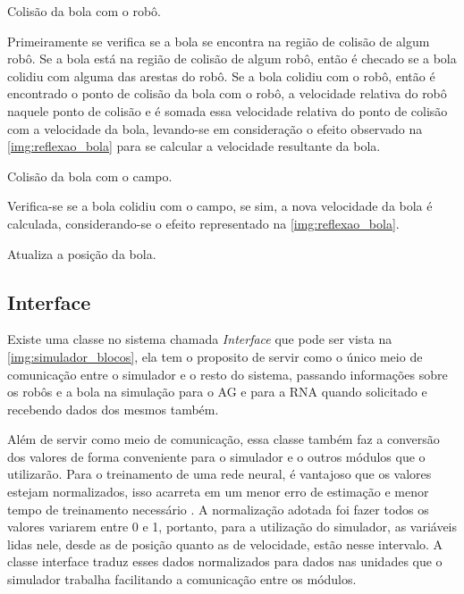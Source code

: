 \begin{alineas}[leftmargin=0pt, itemindent=20pt, labelwidth=15pt, labelsep=5pt, listparindent=1.25cm, align=left]
 \item Colisão da bola com o robô.
 
 Primeiramente se verifica se a bola se encontra na região de colisão de algum robô. Se a bola está na região de colisão de algum robô, então é checado se a bola colidiu com alguma das arestas do robô. Se a bola colidiu com o robô, então é encontrado o ponto de colisão da bola com o robô, a velocidade relativa do robô naquele ponto de colisão e é somada essa velocidade relativa do ponto de colisão com a velocidade da bola, levando-se em consideração o efeito observado na \autoref{img:reflexao_bola} para se calcular a velocidade resultante da bola.

\item Colisão da bola com o campo.

Verifica-se se a bola colidiu com o campo, se sim, a nova velocidade da bola é calculada, considerando-se o efeito representado na \autoref{img:reflexao_bola}.

\item Atualiza a posição da bola.

\end{alineas}

\subsection{Interface}

Existe uma classe no sistema chamada \textit{Interface} que pode ser vista na \autoref{img:simulador_blocos}, ela tem o proposito de servir como o único meio de comunicação entre o simulador e o resto do sistema, passando informações sobre os robôs e a bola na simulação para o AG e para a RNA quando solicitado e recebendo dados dos mesmos também.

Além de servir como meio de comunicação, essa classe também faz a conversão dos valores de forma conveniente para o simulador e o outros módulos que o utilizarão. Para o treinamento de uma rede neural, é vantajoso que os valores estejam normalizados, isso acarreta em um menor erro de estimação e menor tempo de treinamento necessário \cite{589532}. A normalização adotada foi fazer todos os valores variarem entre 0 e 1, portanto, para a utilização do simulador, as variáveis lidas nele, desde as de posição quanto as de velocidade, estão nesse intervalo. A classe interface traduz esses dados normalizados para dados nas unidades que o simulador trabalha facilitando a comunicação entre os módulos.

